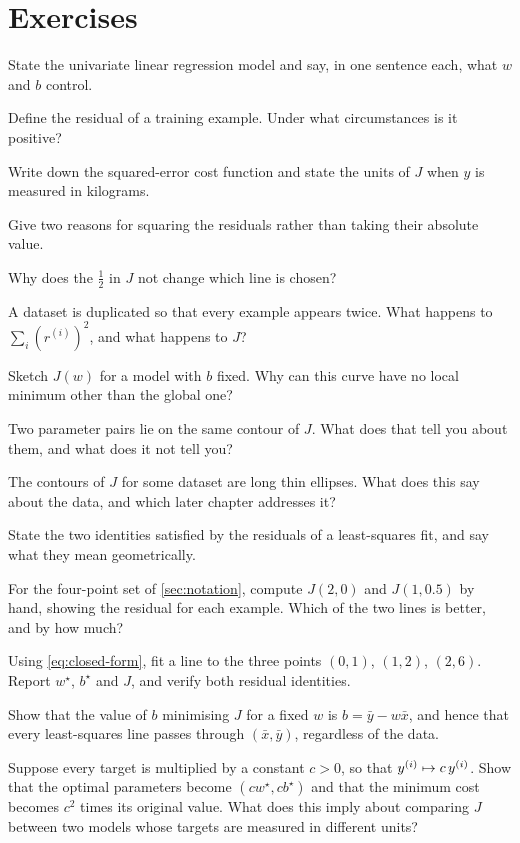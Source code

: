 \section*{Exercises}


\sq State the univariate linear regression model and say, in one sentence each,
what $w$ and $b$ control.

\sq Define the residual of a training example. Under what circumstances is it
positive?

\sq Write down the squared-error cost function and state the units of $J$ when
$y$ is measured in kilograms.

\sq Give two reasons for squaring the residuals rather than taking their
absolute value.

\sq Why does the $\tfrac12$ in $J$ not change which line is chosen?

\sq A dataset is duplicated so that every example appears twice. What happens to
$\sum_i (r^{(i)})^2$, and what happens to $J$?

\sq Sketch $J(w)$ for a model with $b$ fixed. Why can this curve have no local
minimum other than the global one?

\sq Two parameter pairs lie on the same contour of $J$. What does that tell you
about them, and what does it not tell you?

\sq The contours of $J$ for some dataset are long thin ellipses. What does this
say about the data, and which later chapter addresses it?

\sq State the two identities satisfied by the residuals of a least-squares fit,
and say what they mean geometrically.


\ap For the four-point set of \cref{sec:notation}, compute $J(2,0)$ and
$J(1,0.5)$ by hand, showing the residual for each example. Which of the two
lines is better, and by how much?

\ap Using \cref{eq:closed-form}, fit a line to the three points $(0,1)$,
$(1,2)$, $(2,6)$. Report $w^\star$, $b^\star$ and $J$, and verify both residual
identities.

\ap Show that the value of $b$ minimising $J$ for a fixed $w$ is
$b = \bar y - w\bar x$, and hence that every least-squares line passes through
$(\bar x, \bar y)$, regardless of the data.

\ap Suppose every target is multiplied by a constant $c > 0$, so that
$y^{(i)} \mapsto c\,y^{(i)}$. Show that the optimal parameters become
$(cw^\star, cb^\star)$ and that the minimum cost becomes $c^2$ times its
original value. What does this imply about comparing $J$ between two models
whose targets are measured in different units?

